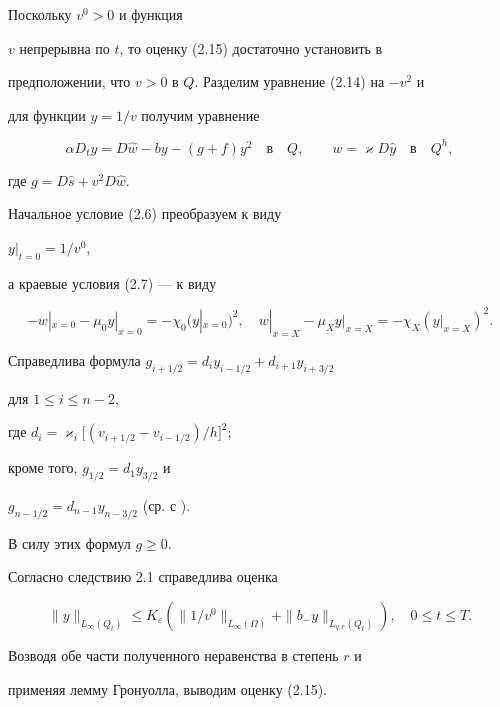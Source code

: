 \documentclass[12pt]{article}
\theoremstyle{plain} %
\theoremstyle{definition}
\numberwithin{equation}{section}
\begin{document}
\begin{pf} Поскольку $v^0>0$ и функция


$v$ непрерывна по $t$, то оценку (2.15) достаточно установить в


предположении, что $v>0$ в $Q$. Разделим уравнение (2.14) на $-v^2$ и


для функции $y=1/v$ получим уравнение


$$


\alpha D_ty=D\widehat w-by-(g+f)y^2\quad\text{в}\quad Q,


\qquad w=\varkappa D\widehat y\quad\text{в}\quad Q^h,


$$


где $g=D\widehat s + v^2 D\widehat w$.


Начальное условие (2.6) преобразуем к виду


$y|_{t=0}=1/{v^0}$,


а краевые условия (2.7) --- к виду


$$


-w|_{x=0}-\mu_0 y|_{x=0}=-\chi_0(y|_{x=0})^2,\quad


w|_{x=X}-\mu_X y|_{x=X}=-\chi_X(y|_{x=X})^2.


$$





Справедлива формула $g_{i+1/2} = d_i y_{i-1/2}+ d_{i+1}y_{i+3/2}$


для $1\le i\le n-2$,


где $d_i = \varkappa_i\bigl[(v_{i+1/2}-v_{i-1/2})/h\bigr]^2$;


кроме того, $g_{1/2} = d_1 y_{3/2}$ и


$g_{n-1/2}=d_{n-1} y_{n-3/2}$ (ср. с \cite{Amo1}).


В силу этих формул $g\ge 0$.





Согласно следствию 2.1 справедлива оценка


$$


\|y\|_{L_\infty(Q_t)}\le


K_{\varepsilon}(\|1/{v^0}\|_{L_\infty(\Omega)}+\|b_- y\|_{L_{q,r}(Q_t)}),


\quad 0\le t\le T.


$$


Возводя обе части полученного неравенства в степень $r$ и


применяя лемму Гронуолла, выводим оценку (2.15).


\end{pf}
\end{document}
